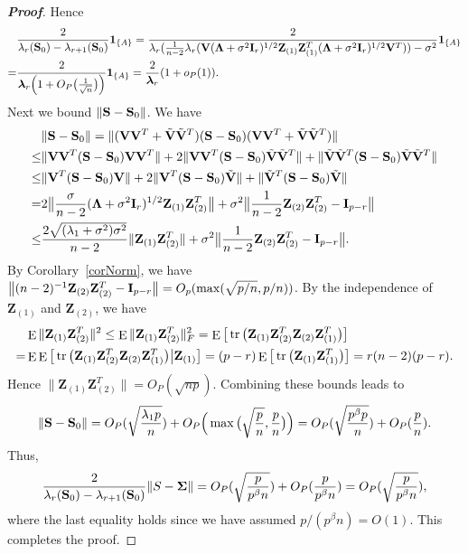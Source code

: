 \documentclass[review]{elsarticle}
\DeclareMathOperator{\mytr}{tr}
\DeclareMathOperator{\myE}{E}
\newcommand{\bZ}{\mathbf{Z}}
\newcommand{\bfsym}[1]{\ensuremath{\boldsymbol{#1}}}
\def\blambda {\bfsym {\lambda}}        \def\bLambda {\bfsym {\Lambda}}
\theoremstyle{plain}
\theoremstyle{definition}
\theoremstyle{remark}
\begin{document}
\begin{appendices}
\begin{proof}[\textbf{Proof}]
        Hence
$$
\begin{aligned}
    &\frac{2}{\lambda_r(\BS_0)-\lambda_{r+1}(\BS_0)}\mathbf{1}_{\{A\}}
    =
    \frac{2}{
        \lambda_r(\frac{1}{n-2}\lambda_r(\BV(\bLambda+\sigma^2 \BI_r)^{1/2}\bZ_{(1)} \bZ_{(1)}^T(\bLambda+\sigma^2 \BI_r)^{1/2}\BV^T))-\sigma^2}\mathbf{1}_{\{A\}}\\
    =&\frac{2}{\blambda_r\Big(1+O_P\big(\frac{1}{\sqrt{n}}\big)\Big)}\mathbf{1}_{\{A\}}
    =\frac{2}{\blambda_r}(1+o_P(1)).
\end{aligned}
    $$
    Next we bound $\|\mathbf{S}-\mathbf{S}_0\|$. 
    We have
    $$
    \begin{aligned}
        &\|\BS-\BS_0\|=
        \|(\BV\BV^T+\tilde{\BV}\tilde{\BV}^T)(\BS-\BS_0)(\BV\BV^T+\tilde{\BV}\tilde{\BV}^T)\|\\
        \leq& \|\BV\BV^T (\BS-\BS_0) \BV\BV^T\|+2 \|\BV\BV^T (\BS-\BS_0) \tilde{\BV}\tilde{\BV}^T\|+\|\tilde{\BV}\tilde{\BV}^T (\BS-\BS_0) \tilde{\BV}\tilde{\BV}^T\|\\
        \leq& \|\BV^T (\BS-\BS_0) \BV\|+2 \|\BV^T (\BS-\BS_0) \tilde{\BV}\|+\|\tilde{\BV}^T (\BS-\BS_0) \tilde{\BV}\|\\
        = &
        2\big\|\frac{\sigma}{n-2}(\bLambda+\sigma^2 \BI_r)^{1/2}\bZ_{(1)} \bZ_{(2)}^T\big\|+
        \sigma^2\big\|\frac{1}{n-2}\bZ_{(2)} \bZ_{(2)}^T- \BI_{p-r}\big\|\\
        \leq & \frac{2\sqrt{(\lambda_1+\sigma^2)\sigma^2}}{n-2}\|\bZ_{(1)}\bZ_{(2)}^T\|+
        \sigma^2\big\|\frac{1}{n-2}\bZ_{(2)} \bZ_{(2)}^T- \BI_{p-r}\big\|.
    \end{aligned}
    $$
    By Corollary~\ref{corNorm}, we have $\big\|(n-2)^{-1}\bZ_{(2)} \bZ_{(2)}^T- \BI_{p-r}\big\|=O_p(\max(\sqrt{p/n},p/n))$.
    By the independence of $\bZ_{(1)}$ and $\bZ_{(2)}$, we have
    $$
    \begin{aligned}
        &\myE \|\bZ_{(1)}\bZ_{(2)}^T\|^2\leq
    \myE \|\bZ_{(1)}\bZ_{(2)}^T\|_F^2
    =
    \myE \big[ \mytr\big(\bZ_{(1)}\bZ_{(2)}^T\bZ_{(2)}\bZ_{(1)}^T\big) \big]\\
        =&
        \myE\myE \big[ \mytr\big(\bZ_{(1)}\bZ_{(2)}^T\bZ_{(2)}\bZ_{(1)}^T\big)\big|\BZ_{(1)} \big]
        =(p-r)
    \myE \big[ \mytr\big(\bZ_{(1)}\bZ_{(1)}^T\big) \big]
        =r(n-2)(p-r).
    \end{aligned}
    $$
    Hence $\|\bZ_{(1)}\bZ_{(2)}^T\|=O_P(\sqrt{np})$.
    Combining these bounds leads to
    $$
    \|\mathbf{S}-\mathbf{S}_0\|=
 O_P(\sqrt{\frac{\lambda_1 p}{n}})+O_P\Big(\max\big(\sqrt{\frac{p}{n}},\frac{p}{n}\big)\Big)
    =
    O_P(\sqrt{\frac{ p^{\beta}p}{n}})+O_P(\frac{p}{n}).
    $$
    Thus,
    $$
   \frac{2}{\lambda_r(\BS_0)-\lambda_{r+1}(\BS_0)}\|S-\bSigma\|=
    O_P(\sqrt{\frac{p}{p^{\beta}n}})+O_P(\frac{p}{p^{\beta}n})=
O_P(\sqrt{\frac{p}{p^{\beta}n}}),
    $$
    where the last equality holds since we have assumed $p/(p^{\beta}n)=O(1)$.
    This completes the proof.


\end{proof}
\end{appendices}
\end{document}
